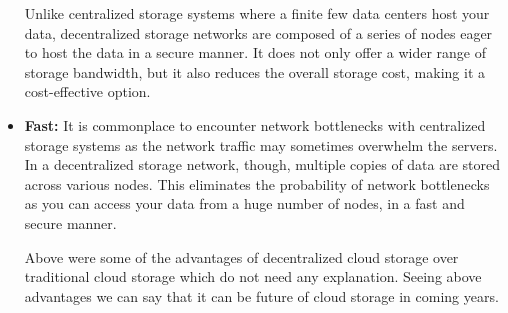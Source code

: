 \begin{itemize}
  Unlike centralized storage systems where a finite few data centers host your data, decentralized storage networks are composed of a series of nodes eager to host the data in a secure manner. It does not only offer a wider range of storage bandwidth, but it also reduces the overall storage cost, making it a cost-effective option. \\
\item \textbf{Fast: }
It is commonplace to encounter network bottlenecks with centralized storage systems as the network traffic may sometimes overwhelm the servers. In a decentralized storage network, though, multiple copies of data are stored across various nodes. This eliminates the probability of network bottlenecks as you can access your data from a huge number of nodes, in a fast and secure manner.

Above were some of the advantages of decentralized cloud storage over traditional cloud storage which do not need any explanation. Seeing above advantages we can say that it can be future of cloud storage in coming years. \\
\end{itemize}
